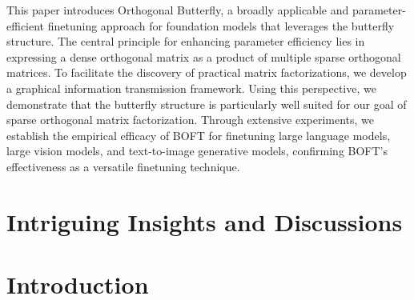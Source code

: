 This paper introduces Orthogonal Butterfly, a broadly applicable and parameter-efficient finetuning approach for foundation models that leverages the butterfly structure. The central principle for enhancing parameter efficiency lies in expressing a dense orthogonal matrix as a product of multiple sparse orthogonal matrices. To facilitate the discovery of practical matrix factorizations, we develop a graphical information transmission framework. Using this perspective, we demonstrate that the butterfly structure is particularly well suited for our goal of sparse orthogonal matrix factorization. Through extensive experiments, we establish the empirical efficacy of BOFT for finetuning large language models, large vision models, and text-to-image generative models, confirming BOFT’s effectiveness as a versatile finetuning technique.

\section{Intriguing Insights and Discussions}

\section{Introduction}